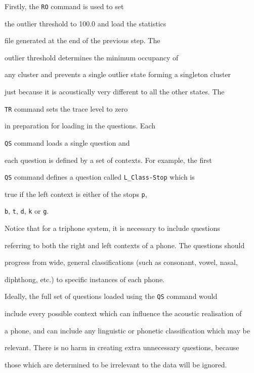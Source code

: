 Firstly, the \texttt{RO} command is used to set


the outlier threshold to 100.0 and load the statistics


file generated at the end of the previous step.  The


outlier threshold determines the minimum occupancy of


any cluster and prevents a single outlier state forming a singleton cluster


just because it is acoustically very different to all the other states.  The


\texttt{TR} command sets the trace level to zero


in preparation for loading in the questions.  Each


\texttt{QS} command loads a single question and


each question is defined by a set of contexts.  For example, the first


\texttt{QS} command defines a question called \texttt{L\_Class-Stop} which is


true if the left context is either of the stops \texttt{p},


\texttt{b}, \texttt{t}, \texttt{d}, \texttt{k} or \texttt{g}.







Notice that for a triphone system, it is necessary to include questions


referring to both the right and left contexts of a phone. The questions should


progress from wide, general classifications (such as consonant, vowel, nasal,


diphthong, etc.) to specific instances of each phone.


Ideally, the full set of questions loaded using the \texttt{QS} command would


include every possible context which can influence the acoustic realisation of


a phone, and can include any linguistic or phonetic classification which may be


relevant. There is no harm in creating extra unnecessary questions, because


those which are determined to be irrelevant to the data will be ignored.





